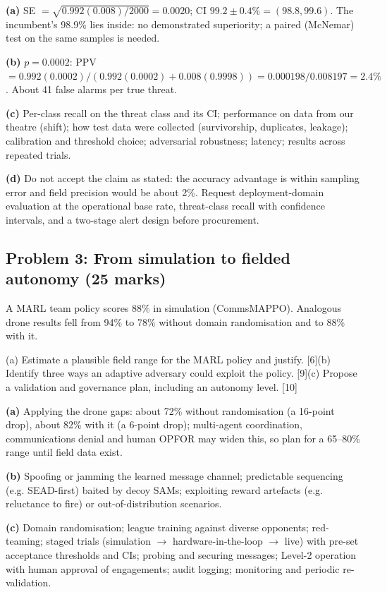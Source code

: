 \documentclass[11pt]{article}
\begin{document}
\begin{soln}\textbf{(a)} SE $=\sqrt{0.992(0.008)/2000}=0.0020$; CI $99.2\pm0.4\%=(98.8,99.6)$. The incumbent's 98.9\% lies inside: no demonstrated superiority; a paired (McNemar) test on the same samples is needed.

\textbf{(b)} $p=0.0002$: PPV $=0.992(0.0002)/(0.992(0.0002)+0.008(0.9998))=0.000198/0.008197=\mathbf{2.4\%}$. About 41 false alarms per true threat.

\textbf{(c)} Per-class recall on the threat class and its CI; performance on data from our theatre (shift); how test data were collected (survivorship, duplicates, leakage); calibration and threshold choice; adversarial robustness; latency; results across repeated trials.

\textbf{(d)} Do not accept the claim as stated: the accuracy advantage is within sampling error and field precision would be about 2\%. Request deployment-domain evaluation at the operational base rate, threat-class recall with confidence intervals, and a two-stage alert design before procurement.\end{soln}

\subsection{Problem 3: From simulation to fielded autonomy \normalfont\small\color{GreyN}(25 marks)}

\begin{prob}A MARL team policy scores 88\% in simulation (CommsMAPPO). Analogous drone results fell from 94\% to 78\% without domain randomisation and to 88\% with it.

(a) Estimate a plausible field range for the MARL policy and justify. [6]\newline (b) Identify three ways an adaptive adversary could exploit the policy. [9]\newline (c) Propose a validation and governance plan, including an autonomy level. [10]\end{prob}

\begin{soln}\textbf{(a)} Applying the drone gaps: about 72\% without randomisation (a 16-point drop), about 82\% with it (a 6-point drop); multi-agent coordination, communications denial and human OPFOR may widen this, so plan for a 65--80\% range until field data exist.

\textbf{(b)} Spoofing or jamming the learned message channel; predictable sequencing (e.g. SEAD-first) baited by decoy SAMs; exploiting reward artefacts (e.g. reluctance to fire) or out-of-distribution scenarios.

\textbf{(c)} Domain randomisation; league training against diverse opponents; red-teaming; staged trials (simulation $\rightarrow$ hardware-in-the-loop $\rightarrow$ live) with pre-set acceptance thresholds and CIs; probing and securing messages; Level-2 operation with human approval of engagements; audit logging; monitoring and periodic re-validation.\end{soln}
\end{document}
